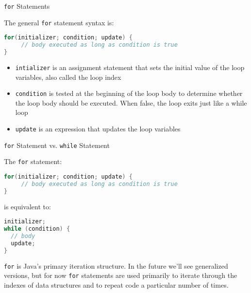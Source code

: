 \documentclass{beamer}
\begin{document}
\begin{frame}[fragile]{{\tt for} Statements}


The general {\tt for} statement syntax is:
\begin{lstlisting}[language=Java]
for(initializer; condition; update) {
     // body executed as long as condition is true
}
\end{lstlisting}
\begin{itemize}
\item {\tt intializer} is an assignment statement that sets the initial value of the loop variables, also called the loop index
\item {\tt condition} is tested at the beginning of the loop body to determine whether the loop body should be executed.  When false, the loop exits just like a while loop
\item {\tt update} is an expression that updates the loop variables
\end{itemize}

\end{frame}

\begin{frame}[fragile]{{\tt for} Statement vs. {\tt while} Statement}


The {\tt for} statement:
\begin{lstlisting}[language=Java]
for(initializer; condition; update) {
     // body executed as long as condition is true
}
\end{lstlisting}

is equivalent to:
\begin{lstlisting}[language=Java]
initializer;
while (condition) {
  // body
  update;
}
\end{lstlisting}


{\tt for} is Java's primary iteration structure.  In the future we'll see generalized versions, but for now {\tt for} statements are used primarily to iterate through the indexes of data structures and to repeat code a particular number of times.


\end{frame}
\end{document}
